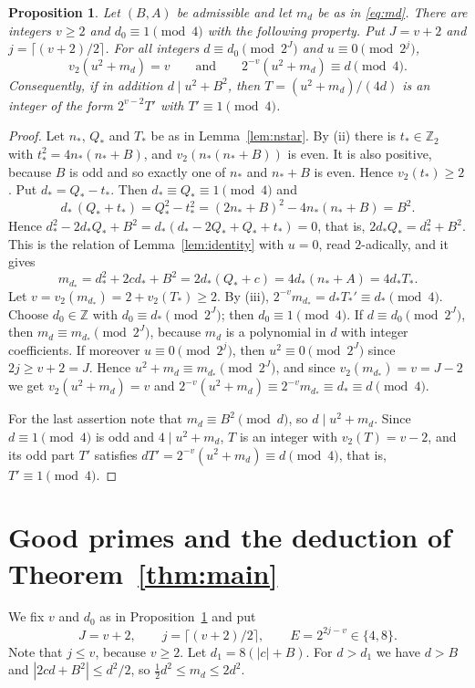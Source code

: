 \documentclass[11pt]{amsart}
\newtheorem{proposition}[theorem]{Proposition}
\theoremstyle{remark}
\theoremstyle{definition}
\numberwithin{equation}{section}
\newcommand{\Z}{\mathbb{Z}}
\newcommand{\Zt}{\mathbb{Z}_2}
\begin{document}
\begin{proposition}\label{prop:seed}
Let $(B,A)$ be admissible and let $m_d$ be as in \eqref{eq:md}. There are integers $v\ge2$ and $d_0\equiv1\pmod4$ with the following property. Put $J=v+2$ and $j=\lceil(v+2)/2\rceil$. For all integers $d\equiv d_0\pmod{2^J}$ and $u\equiv0\pmod{2^j}$,
\[
v_2(u^2+m_d)=v\qquad\text{and}\qquad2^{-v}(u^2+m_d)\equiv d\pmod 4 .
\]
Consequently, if in addition $d\mid u^2+B^2$, then $T=(u^2+m_d)/(4d)$ is an integer of the form $2^{v-2}T'$ with $T'\equiv1\pmod4$.
\end{proposition}

\begin{proof}
Let $n_*$, $Q_*$ and $T_*$ be as in Lemma~\ref{lem:nstar}. By (ii) there is $t_*\in\Zt$ with $t_*^2=4n_*(n_*+B)$, and $v_2(n_*(n_*+B))$ is even. It is also positive, because $B$ is odd and so exactly one of $n_*$ and $n_*+B$ is even. Hence $v_2(t_*)\ge2$. Put $d_*=Q_*-t_*$. Then $d_*\equiv Q_*\equiv1\pmod4$ and
\[
d_*\,(Q_*+t_*)=Q_*^2-t_*^2=(2n_*+B)^2-4n_*(n_*+B)=B^2 .
\]
Hence $d_*^2-2d_*Q_*+B^2=d_*(d_*-2Q_*+Q_*+t_*)=0$, that is, $2d_*Q_*=d_*^2+B^2$. This is the relation of Lemma~\ref{lem:identity} with $u=0$, read $2$-adically, and it gives
\[
m_{d_*}=d_*^2+2cd_*+B^2=2d_*(Q_*+c)=4d_*(n_*+A)=4d_*T_*.
\]
Let $v=v_2(m_{d_*})=2+v_2(T_*)\ge2$. By (iii), $2^{-v}m_{d_*}=d_*T_*'\equiv d_*\pmod 4$. Choose $d_0\in\Z$ with $d_0\equiv d_*\pmod{2^J}$; then $d_0\equiv1\pmod 4$. If $d\equiv d_0\pmod{2^J}$, then $m_d\equiv m_{d_*}\pmod{2^J}$, because $m_d$ is a polynomial in $d$ with integer coefficients. If moreover $u\equiv0\pmod{2^j}$, then $u^2\equiv0\pmod{2^J}$ since $2j\ge v+2=J$. Hence $u^2+m_d\equiv m_{d_*}\pmod{2^J}$, and since $v_2(m_{d_*})=v=J-2$ we get $v_2(u^2+m_d)=v$ and $2^{-v}(u^2+m_d)\equiv2^{-v}m_{d_*}\equiv d_*\equiv d\pmod4$.

For the last assertion note that $m_d\equiv B^2\pmod d$, so $d\mid u^2+m_d$. Since $d\equiv1\pmod 4$ is odd and $4\mid u^2+m_d$, $T$ is an integer with $v_2(T)=v-2$, and its odd part $T'$ satisfies $dT'=2^{-v}(u^2+m_d)\equiv d\pmod4$, that is, $T'\equiv1\pmod 4$.
\end{proof}

\section{Good primes and the deduction of Theorem~\ref{thm:main}}\label{sec:good}

We fix $v$ and $d_0$ as in Proposition~\ref{prop:seed} and put
\begin{equation}\label{eq:JjE}
J=v+2,\qquad j=\lceil(v+2)/2\rceil,\qquad E=2^{2j-v}\in\{4,8\}.
\end{equation}
Note that $j\le v$, because $v\ge2$. Let $d_1=8(|c|+B)$. For $d>d_1$ we have $d>B$ and $|2cd+B^2|\le d^2/2$, so $\frac12d^2\le m_d\le2d^2$.
\end{document}
